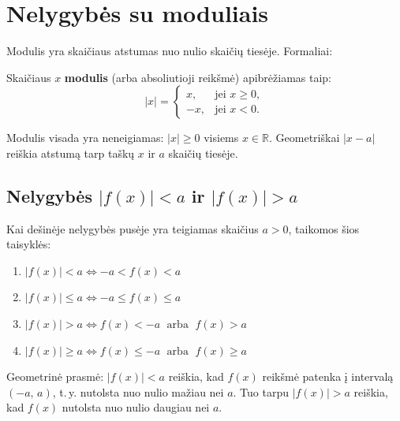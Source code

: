 \section{Nelygybės su moduliais}

Modulis yra skaičiaus atstumas nuo nulio skaičių tiesėje. Formaliai:

\begin{definition}
Skaičiaus $x$ \textbf{modulis} (arba absoliutioji reikšmė) apibrėžiamas taip:
\[
|x| =
\begin{cases}
x, & \text{jei } x \geq 0, \\
-x, & \text{jei } x < 0.
\end{cases}
\]
\end{definition}

\begin{remark}
Modulis visada yra neneigiamas: $|x| \geq 0$ visiems $x \in \mathbb{R}$.
Geometriškai $|x - a|$ reiškia atstumą tarp taškų $x$ ir $a$ skaičių tiesėje.
\end{remark}

\subsection{Nelygybės \texorpdfstring{$|f(x)| < a$}{|f(x)| < a} ir \texorpdfstring{$|f(x)| > a$}{|f(x)| > a}}

Kai dešinėje nelygybės pusėje yra teigiamas skaičius $a > 0$, taikomos šios taisyklės:

\begin{tcolorbox}[title=Pagrindinės taisyklės ($a > 0$), colback=blue!5, colframe=blue!60]
\begin{enumerate}[label=\textbf{\arabic*.}]
  \item $|f(x)| < a \iff -a < f(x) < a$
  \item $|f(x)| \leq a \iff -a \leq f(x) \leq a$
  \item $|f(x)| > a \iff f(x) < -a \;\text{ arba }\; f(x) > a$
  \item $|f(x)| \geq a \iff f(x) \leq -a \;\text{ arba }\; f(x) \geq a$
\end{enumerate}
\end{tcolorbox}

\begin{remark}
Geometrinė prasmė: $|f(x)| < a$ reiškia, kad $f(x)$ reikšmė patenka į intervalą $(-a,\, a)$, t.\,y. nutolsta nuo nulio mažiau nei $a$. Tuo tarpu $|f(x)| > a$ reiškia, kad $f(x)$ nutolsta nuo nulio daugiau nei $a$.
\end{remark}

